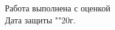 \begin{titlepage}
		Работа выполнена с оценкой \hspace{1cm} \underline{\hspace{8cm}} \\ 
		\vspace{1cm}
		Дата защиты "\underline{\hspace{0.7cm}}"\hspace{0.2cm}\underline{\hspace{2cm}}\hspace{0.2cm}20\underline{\hspace{0.7cm}}г.
\end{titlepage}